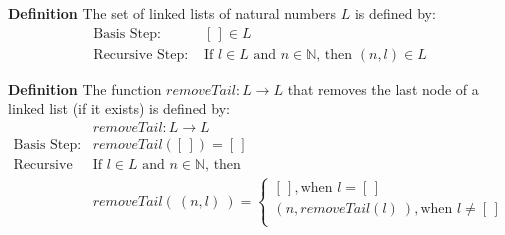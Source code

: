 \documentclass[12pt, oneside]{article}
\begin{document}
{\bf Definition} The set of linked lists of natural numbers $L$ is defined by:
\[
\begin{array}{ll}
    \textrm{Basis Step: } & [\,] \in L \\
    \textrm{Recursive Step: } & \textrm{If } l \in L\textrm{ and }n \in \mathbb{N} \textrm{, then } (n, l) \in L
\end{array}
\]
%

{\bf Definition} The function $\textit{removeTail} : L  \to L$ that removes the last node of a linked list (if it 
exists) is defined by:
\[
\begin{array}{llll}
& \textit{removeTail} : L \to L \\
\textrm{Basis Step:} &  \textit{removeTail}([\,]) = [\,]\\
\textrm{Recursive Step:} & \textrm{If } l \in L\textrm{ and }n \in \mathbb{N}\textrm{, then  }\\&\textit{removeTail}(~(n, l)~) 
= 
\begin{cases}
   [\,], \textrm{when } l = [\,] \\
   (n, removeTail(l)~),
   \textrm{when } l \neq [\,] \\
\end{cases}

\end{array}
\]
\end{document}
